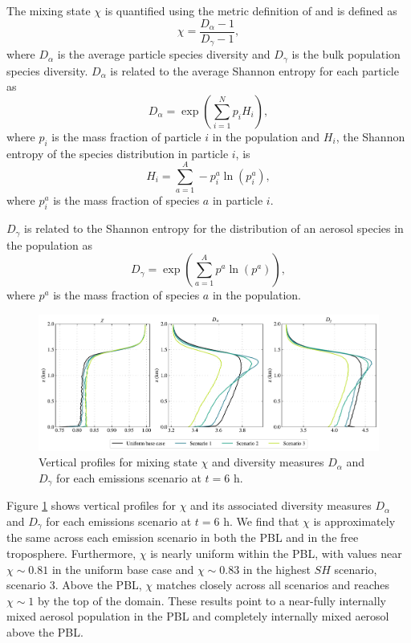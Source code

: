 The mixing state $\chi$ is quantified using the metric definition of \cite{riemer_quantifying_2013} and is defined as 
\begin{equation}
\chi = \frac{D_{\alpha}-1}{D_{\gamma}-1},
\end{equation}
where $D_{\alpha}$ is the average particle species diversity and $D_{\gamma}$ is the bulk population species diversity. $D_{\alpha}$ is related to the average Shannon entropy for each particle as 
 \begin{equation}
D_{\alpha} = \exp\left(\sum_{i=1}^N p_i H_i\right),
\end{equation}
where $p_i$ is the mass fraction of particle $i$ in the population and $H_i$, the Shannon entropy of the species distribution in particle $i$, is 
\begin{equation}
H_i = \sum_{a=1}^A -p_i^a\ln(p_i^a),
\end{equation}
where $p_i^a$ is the mass fraction of species $a$ in particle $i$.

$D_{\gamma}$ is related to the Shannon entropy for the distribution of an aerosol species in the population as 
 \begin{equation}
D_{\gamma} = \exp\left(\sum_{a=1}^A p^a \ln(p^a)\right),
\end{equation}
where $p^a$ is the mass fraction of species $a$ in the population.

\begin{figure}[!t]
  \centering
    \includegraphics[width=\textwidth]{figures/chapter5/aerosol-mixingstate-vertical-profiles-time36.pdf}
    \caption{Vertical profiles for mixing state $\chi$ and diversity measures $D_{\alpha}$ and $D_{\gamma}$ for each emissions scenario at $t=6$ h.}
    \label{fig:mixing-state-vert-profiles}
\end{figure}

Figure \ref{fig:mixing-state-vert-profiles} shows vertical profiles for $\chi$ and its associated diversity measures $D_{\alpha}$ and $D_{\gamma}$ for each emissions scenario at $t=6$ h. We find that $\chi$ is approximately the same across each emission scenario in both the PBL and in the free troposphere. Furthermore, $\chi$ is nearly uniform within the PBL, with values near $\chi\sim0.81$ in the uniform base case and $\chi\sim0.83$ in the highest $SH$ scenario, scenario 3. Above the PBL, $\chi$ matches closely across all scenarios and reaches $\chi\sim1$ by the top of the domain. These results point to a near-fully internally mixed aerosol population in the PBL and completely internally mixed aerosol above the PBL. 

